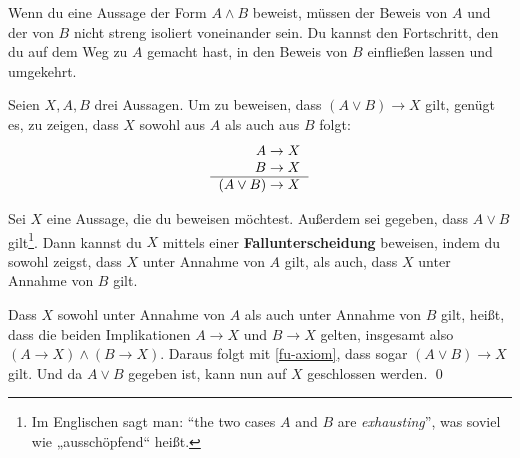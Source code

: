 \begin{bem}
 Wenn du eine Aussage der Form $A\land B$ beweist, müssen der Beweis von $A$ und der von $B$ nicht streng isoliert voneinander sein. Du kannst den Fortschritt, den du auf dem Weg zu $A$ gemacht hast, in den Beweis von $B$ einfließen lassen und umgekehrt.
\end{bem}





\begin{axi} \label{fu-axiom}
Seien $X,A,B$ drei Aussagen. Um zu beweisen, dass $(A\lor B)\to X$ gilt, genügt es, zu zeigen, dass $X$ sowohl aus $A$ als auch aus $B$ folgt:
\[ \begin{tabular}{r}
    $A\to X$ \\
    $B\to X$ \\
    \hline
    $(A\lor B)\to X$
   \end{tabular} \]
\end{axi}





\begin{sat}[Fallunterscheidungen] \label{fallunterscheidung}
Sei $X$ eine Aussage, die du beweisen möchtest. Außerdem sei gegeben, dass $A\lor B$ gilt\footnote{Im Englischen sagt man: ``the two cases $A$ and $B$ are \emph{exhausting}'', was soviel wie „ausschöpfend“ heißt.}. Dann kannst du $X$ mittels einer \textbf{Fallunterscheidung} beweisen, indem du sowohl zeigst, dass $X$ unter Annahme von $A$ gilt, als auch, dass $X$ unter Annahme von $B$ gilt.
\end{sat}
\begin{bew}
 Dass $X$ sowohl unter Annahme von $A$ als auch unter Annahme von $B$ gilt, heißt, dass die beiden Implikationen $A\to X$ und $B\to X$ gelten, insgesamt also $(A\to X)\land (B\to X)$. Daraus folgt mit \cref{fu-axiom}, dass sogar $(A\lor B)\to X$ gilt. Und da $A\lor B$ gegeben ist, kann nun auf $X$ geschlossen werden. \qed
\end{bew}



